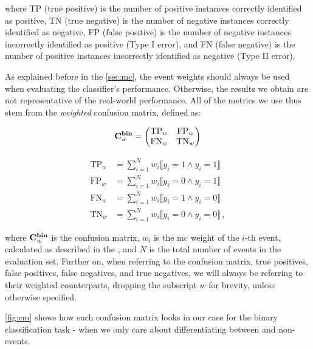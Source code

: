 where TP (true positive) is the number of positive instances correctly identified as positive, TN (true negative) is the
number of negative instances correctly identified as negative, FP (false positive) is the number of negative instances
incorrectly identified as positive (Type I error), and FN (false negative) is the number of positive instances
incorrectly identified as negative (Type II error).

As explained before in the \autoref{sec:mc}, the event weights should always be used when evaluating the classifier's
performance. Otherwise, the results we obtain are not representative of the real-world performance. All of the metrics
we use thus stem from the \emph{weighted} confusion matrix, defined as:

\begin{equation}
    \mathbf{C}^{\textbf{bin}}_w = \begin{pmatrix}
        \text{TP}_{w} & \text{FP}_{w} \\
        \text{FN}_{w} & \text{TN}_{w} \\
    \end{pmatrix}
\end{equation}

\begin{align}
    \text{TP}_{w} & = \sum_{i=1}^{N} w_i \llbracket y_i = 1 \land \hat{y}_i = 1 \rrbracket    \\
    \text{FP}_{w} & = \sum_{i=1}^{N} w_i \llbracket y_i = 0 \land \hat{y}_i = 1 \rrbracket    \\
    \text{FN}_{w} & = \sum_{i=1}^{N} w_i \llbracket y_i = 1 \land \hat{y}_i = 0 \rrbracket    \\
    \text{TN}_{w} & = \sum_{i=1}^{N} w_i \llbracket y_i = 0 \land \hat{y}_i = 0 \rrbracket\,,
\end{align}

where $\mathbf{C}^{\textbf{bin}}_w$ is the confusion matrix, $w_i$ is the \gls{mc} weight of the $i$-th event, calculated as described in the
, and $N$ is the total number of events in the evaluation set. Further on, when referring to
the confusion matrix, true positives, false positives, false negatives, and true negatives, we will always be referring
to their weighted counterparts, dropping the subscript $w$ for brevity, unless otherwise specified.

\autoref{fig:cm} shows how such confusion matrix looks in our case for the binary classification task - when we only
care about differentiating between \tth and non-\tth events.

